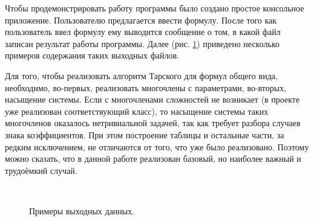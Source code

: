 Чтобы продемонстрировать работу программы было создано простое консольное приложение. Пользователю предлагается ввести формулу. После того как пользователь ввел формулу ему выводится сообщение о том, в какой файл записан результат работы программы. Далее (рис. \ref{fig:примеры}) приведено несколько примеров содержания таких выходных файлов.

Для того, чтобы реализовать алгоритм Тарского для формул общего вида, необходимо, во-первых, реализовать многочлены с параметрами, во-вторых, насыщение системы. Если с многочленами сложностей не возникает (в проекте уже реализован соответствующий класс), то насыщение системы таких многочленов оказалось нетривиальной задачей, так как требует разбора случаев знака коэффициентов. При этом построение таблицы и остальные части, за редким исключением, не отличаются от того, что уже было реализовано. Поэтому можно сказать, что в данной работе реализован базовый, но наиболее важный и трудоёмкий случай.


\begin{figure}[ht]
    \begin{minipage}[ht]{0.349\linewidth}
    \end{minipage}
    \hfill
    \begin{minipage}[ht]{0.65\linewidth}
    \end{minipage}
    \\
    \begin{center}
        \begin{minipage}[ht]{0.8\linewidth}
        \end{minipage} 
    \end{center}
    \caption{Примеры выходных данных.}  
    \label{fig:примеры}
\end{figure}